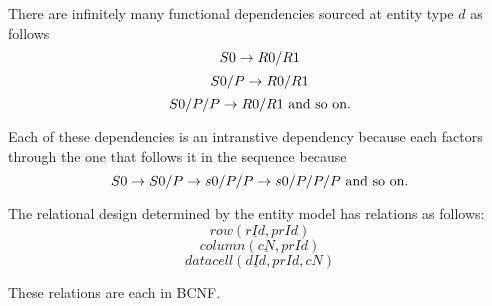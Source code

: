 There are infinitely many functional dependencies sourced at entity type $d$ as follows
\begin{equation*}
S0 \rightarrow R0/R1
\end{equation*}
\begin{equation*}
S0/P \rightarrow R0/R1
\end{equation*}
\begin{equation*}
S0/P/P \rightarrow R0/R1 \mbox{ and so on.}
\end{equation*}

Each of these dependencies is an intranstive dependency because each
factors through the one that follows it in the sequence because
\begin{equation}
S0 \rightarrow S0/P \rightarrow s0/P/P \rightarrow s0/P/P/P \mbox{ and so on.}
\end{equation}


The relational design determined by the entity model has relations as follows:
\begin{equation}
\label{rowrelation}
row(\underline{rId}, prId)
\end{equation}
\begin{equation}
\label{columnrelation}
column(\underline{cN}, prId)
\end{equation}
\begin{equation}
\label{rowrelation}
datacell(\underline{dId}, prId, cN)
\end{equation}

These relations are each in BCNF.






